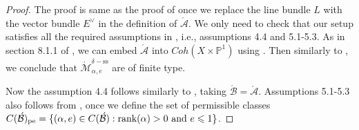 \documentclass[11pt]{amsart}
\theoremstyle{remark}
\newcommand{\Adash}{\acute{\mathcal{A}}}
\newcommand{\Bdash}{\acute{\mathcal{B}}}
\newcommand{\mb}[1]{\mathbb{#1}}
\newcommand{\Mdash}{\acute{\mathcal{M}}}
\newcommand{\rk}{\textnormal{rank}}
\newcommand{\pe}[0]{\textnormal{pe}}
\renewcommand{\ss}[0]{\text{ss}}
\numberwithin{theorem}{section}
\begin{document}
    \begin{proof}
        The proof is same as the proof of \cite[Theorem 8.24]{Joy21}
        once we replace the line bundle $L$ with the vector bundle $E^\vee$ in the definition of $\Adash$.
        We only need to check that our setup satisfies all the required assumptions in \cite{Joy21}, i.e., assumptions 4.4 and 5.1-5.3.
        As in section 8.1.1 of \cite{Joy21},
        we can embed $\Adash$ into $Coh(X \times \mb P^1)$ using
        \cite{GP94}.
       Then similarly to \cite[Proposition 8.12]{Joy21}, we conclude 
       that $\Mdash^{\delta-\ss}_{\alpha,e}$ are of finite type.
        
        Now the assumption 4.4 follows similarly to \cite[Section 8.2.1]{Joy21},
        taking $\Bdash= \Adash$.
        Assumptions 5.1-5.3 also follows from \cite[Section 8.2.2-8.2.4]{Joy21},
        once we define the set of permissible classes
        $C(\Bdash)_\pe = \{(\alpha,e) \in C(\Bdash) : \rk(\alpha)>0 \text{ and } e\leqslant 1\}$.
    \end{proof}
\end{document}
